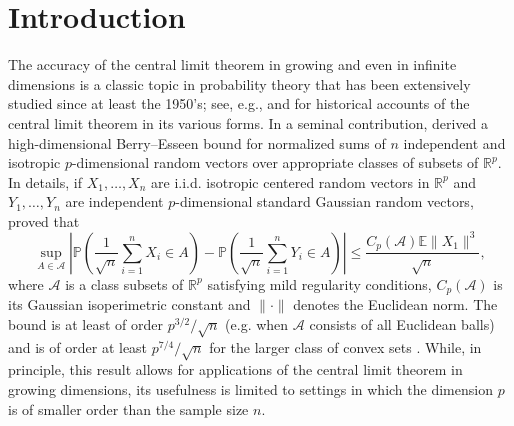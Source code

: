 \documentclass[aos]{imsart}
\begin{document}
\begin{frontmatter}
\begin{keyword}[class=MSC]
\end{keyword}

\begin{keyword}
\end{keyword}

\end{frontmatter}


\section{Introduction}


The accuracy of the central limit theorem in growing and even in infinite dimensions is a classic topic in probability theory that has been extensively studied since at least the 1950's; see, e.g., \cite{paulauskas2012approximation} and \cite{MR643968} for  historical accounts of the central limit theorem in its various forms.  In a seminal contribution, \cite{bentkus03} derived a high-dimensional Berry--Esseen bound for normalized sums of $n$ independent and isotropic $p$-dimensional random vectors over appropriate classes of subsets of $\mathbb{R}^p$. In details, if $X_1,\ldots,X_n$ are i.i.d. isotropic centered random vectors in $\mathbb{R}^p$  and $Y_1,\ldots,Y_n$ are independent $p$-dimensional  standard Gaussian random vectors, \cite{bentkus03} proved that 
\[
    \sup_{A \in \mathcal{A}} \left| \mathbb{P}\left( \frac{1}{\sqrt{n}} \sum_{i=1}^n X_i \in A \right) - \mathbb{P}\left( \frac{1}{\sqrt{n}} \sum_{i=1}^n Y_i \in A\right) \right| \leq \frac{C_p(\mathcal{A}) \mathbb{E}\| X_1\|^3}{\sqrt{n}},
\]
where $\mathcal{A}$ is a class subsets of $\mathbb{R}^p$ satisfying mild regularity conditions,  $C_p(\mathcal{A})$ is its Gaussian isoperimetric constant and $\| \cdot \|$ denotes the Euclidean norm. The bound is at least of order $p^{3/2}/\sqrt{n}$ (e.g. when $\mathcal{A}$ consists of all Euclidean balls) and is of order at least $p^{7/4}/\sqrt{n}$ for the larger class of convex sets \citep[see][]{nazarov2003maximal}. While, in principle, this result allows for applications of the central limit theorem in growing dimensions, its usefulness is limited to settings in which the dimension $p$ is of smaller order than the sample size $n$. %
\end{document}
